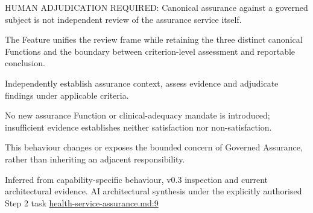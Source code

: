 HUMAN ADJUDICATION REQUIRED: Canonical assurance against a governed subject is not independent review of the assurance service itself.



The Feature unifies the review frame while retaining the three distinct canonical Functions and the boundary between criterion-level assessment and reportable conclusion.



Independently establish assurance context, assess evidence and adjudicate findings under applicable criteria.



No new assurance Function or clinical-adequacy mandate is introduced; insufficient evidence establishes neither satisfaction nor non-satisfaction.



This behaviour changes or exposes the bounded concern of Governed Assurance, rather than inheriting an adjacent responsibility.


Inferred from capability-specific behaviour, v0.3 inspection and current architectural evidence. AI architectural synthesis under the explicitly authorised Step 2 task \hyperref[evidence:14c8f26d232fcb78]{health-service-assurance.md:9}
